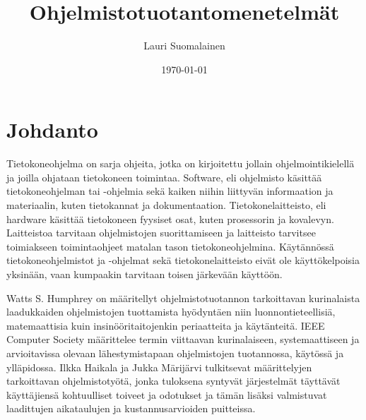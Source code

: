 \documentclass[finnish,12pt]{tktltiki2}
\title{Ohjelmistotuotantomenetelmät}
\author{Lauri Suomalainen}
\date{\today}
\theoremstyle{definition}
\theoremstyle{remark}
\begin{document}

\frontmatter      %

\maketitle        %
\makeabstract     %

\tableofcontents  %


\mainmatter       %

\section{Johdanto}

\onehalfspacing
Tietokoneohjelma on sarja ohjeita, jotka on kirjoitettu jollain ohjelmointikielellä ja joilla ohjataan tietokoneen toimintaa. \newline
Software, eli ohjelmisto käsittää tietokoneohjelman tai -ohjelmia sekä kaiken niihin liittyvän informaation ja materiaalin, kuten tietokannat ja dokumentaation. \newline Tietokonelaitteisto, eli hardware käsittää tietokoneen fyysiset osat, kuten prosessorin ja kovalevyn. Laitteistoa tarvitaan ohjelmistojen suorittamiseen ja laitteisto tarvitsee toimiakseen toimintaohjeet matalan tason tietokoneohjelmina. Käytännössä tietokoneohjelmistot ja -ohjelmat sekä tietokonelaitteisto eivät ole käyttökelpoisia yksinään, vaan kumpaakin tarvitaan toisen järkevään käyttöön.

Watts S. Humphrey on määritellyt ohjelmistotuotannon tarkoittavan kurinalaista laadukkaiden ohjelmistojen tuottamista hyödyntäen niin luonnontieteellisiä, matemaattisia kuin insinööritaitojenkin periaatteita ja käytänteitä\cite{Humphrey:1988:SEP:75110.75122}. IEEE Computer Society määrittelee termin viittaavan kurinalaiseen, systemaattiseen ja arvioitavissa olevaan lähestymistapaan ohjelmistojen tuotannossa, käytössä ja ylläpidossa\cite{swebok}. Ilkka Haikala ja Jukka Märijärvi tulkitsevat määrittelyjen tarkoittavan ohjelmistotyötä, jonka tuloksena syntyvät järjestelmät täyttävät käyttäjiensä kohtuulliset toiveet ja odotukset ja tämän lisäksi valmistuvat laadittujen aikataulujen ja kustannusarvioiden puitteissa\cite{haikala2003ohjelmistotuotanto}.


%
%
% 
%







% 
\end{document}
